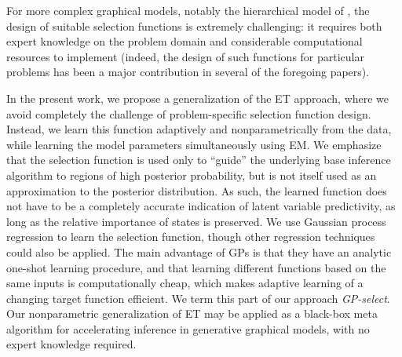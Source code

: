 For more complex graphical models, notably the hierarchical model of \citep{DaiLucke2014},  the design of suitable selection functions
is extremely challenging: it requires both expert knowledge
on the problem domain and considerable computational resources to implement
 (indeed, the design of such functions for  particular problems
has been a major contribution in several of the foregoing papers).

In the present work, we propose a generalization of the ET approach, where
we avoid completely the challenge of problem-specific selection function design.
Instead,
we learn this function  adaptively and nonparametrically
from the data,
 while learning the model
parameters  simultaneously using EM.
We emphasize that the selection function is  used only to ``guide'' the underlying
base inference algorithm to regions of high posterior probability, but is not itself
used as an approximation to the posterior distribution. As such, the learned
function does not have to be a completely accurate indication of latent
variable predictivity,
as long as the relative importance of states is preserved.
We use  Gaussian process
regression \citep{RasmussenGPbook} to learn the selection function, though other regression techniques could
also be applied. The main advantage of GPs
is that they have an analytic one-shot learning procedure, and that learning different
functions based on the same inputs is computationally cheap, which makes adaptive learning
of a changing target function efficient. We term this part of our approach
\textit{GP-select}.
Our nonparametric generalization of  ET may be applied as a black-box
meta algorithm for accelerating inference in  generative graphical models,
with no expert knowledge required.






